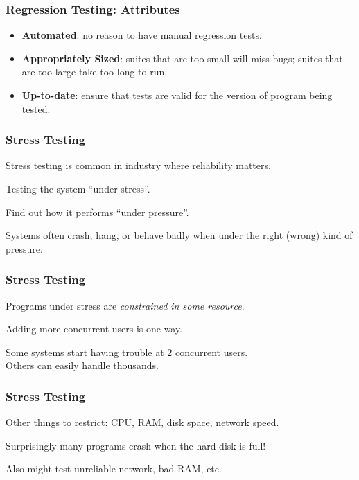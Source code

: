 \begin{frame}
\frametitle{Regression Testing: Attributes}

\begin{changemargin}{1cm}

\begin{itemize}
\item \textbf{Automated}: no reason to have manual regression tests.\\[1em]
\item \textbf{Appropriately Sized}: suites that are too-small will miss bugs; suites that are too-large take too long to run.\\[1em]
\item \textbf{Up-to-date}: ensure that tests are valid for the version of program being tested.
\end{itemize}
\end{changemargin}

\end{frame}

\begin{frame}
\frametitle{Stress Testing}

\begin{changemargin}{1cm}
Stress testing is common in industry where reliability matters.

Testing the system ``under stress''.

Find out how it performs ``under pressure''.

Systems often crash, hang, or behave badly when under the right (wrong) kind of pressure.

\end{changemargin}
\end{frame}

\begin{frame}
\frametitle{Stress Testing}

\begin{changemargin}{1cm}
Programs under stress are \textit{constrained in some resource}.

Adding more concurrent users is one way.

Some systems start having trouble at 2 concurrent users.\\
\quad Others can easily handle thousands.

\end{changemargin}
\end{frame}

\begin{frame}
\frametitle{Stress Testing}

\begin{changemargin}{1cm}
Other things to restrict: CPU, RAM, disk space, network speed.

Surprisingly many programs crash when the hard disk is full!

Also might test unreliable network, bad RAM, etc.

\end{changemargin}
\end{frame}

